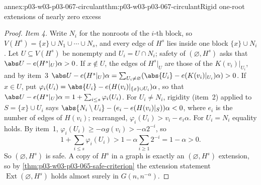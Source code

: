\begin{annexitem}{annex:p03-w03-p03-067-circulant}{thm:p03-w03-p03-067-circulant}{Rigid one-root extensions of nearly zero excess}
\begin{proof}
\emph{Item 4.}  Write \(N_i\) for the nonroots of the \(i\)-th block, so
\(V(H^s)=\{x\}\cup N_1\cup\cdots\cup N_s\), and every edge of \(H^s\) lies
inside one block \(\{x\}\cup N_i\).  Let \(U\subseteq V(H^s)\) be nonempty
and \(U_i=U\cap N_i\); safety of \((\varnothing,H^s)\) asks that
\(\abs U-e(H^s|_U)\alpha>0\).  If \(x\notin U\), the edges of \(H^s|_U\) are
those of the \(K(v_i)|_{U_i}\), and by item~3
\(\abs U-e(H^s|_U)\alpha=\sum_{U_i\neq\varnothing}(\abs{U_i}-e(K(v_i)|_{U_i})\alpha)>0\).
If \(x\in U\), put
\(\varphi_i(U_i)=\abs{U_i}-e(H(v_i)|_{\{x\}\cup U_i})\alpha\), so that
\(\abs U-e(H^s|_U)\alpha=1+\sum_{i\leq s}\varphi_i(U_i)\).  For
\(U_i\neq N_i\), rigidity (item~2) applied to \(S=\{x\}\cup U_i\) says
\(\abs{N_i\setminus U_i}-(e_i-e(H(v_i)|_S))\alpha<0\), where \(e_i\) is the
number of edges of \(H(v_i)\); rearranged, \(\varphi_i(U_i)>v_i-e_i\alpha\).
For \(U_i=N_i\) equality holds.  By item~1,
\(\varphi_i(U_i)\geq-\alpha g(v_i)>-\alpha2^{-i}\), so
\[
 1+\sum_{i\leq s}\varphi_i(U_i)>1-\alpha\sum_{i\geq1}2^{-i}=1-\alpha>0.
\]
So \((\varnothing,H^s)\) is safe.  A copy of \(H^s\) in a graph is exactly an
\((\varnothing,H^s)\) extension, so by
\cref{thm:p03-w03-p03-065-safe-criterion} the extension statement
\(\operatorname{Ext}(\varnothing,H^s)\) holds almost surely in
\(G(n,n^{-\alpha})\).
\end{proof}
\end{annexitem}


